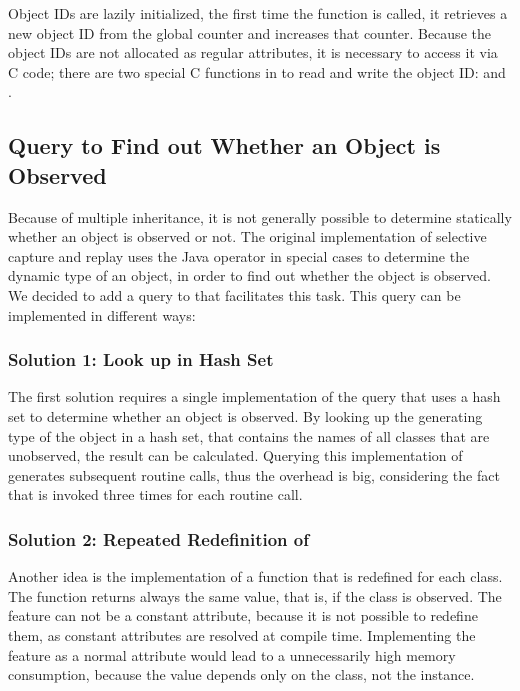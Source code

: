 Object IDs are lazily initialized, the first time the function  is called, it retrieves a new object ID from the global counter  and increases that counter. Because the object IDs are not allocated as regular attributes, it is necessary to access it via C code; there are two special C functions in  to read and write the object ID:  and .


\subsection{Query to Find out Whether an Object is Observed}
\label{lbl:is_observed}
Because of multiple inheritance, it is not generally possible to determine statically whether an object is observed or not. The original implementation of selective capture and replay uses the Java operator  in special cases to determine the dynamic type of an object, in order to find out whether the object is observed. We decided to add a query to  that facilitates this task. This query can be implemented in different ways: 

\subsubsection{Solution 1: Look up in Hash Set}
The first solution requires a single implementation of the query  that uses a hash set to determine whether an object is observed. By looking up the generating type of the object in a hash set, that contains the names of all classes that are unobserved, the result can be calculated. Querying this implementation of  generates subsequent routine calls, thus the overhead is big, considering the fact that  is invoked three times for each routine call.

\subsubsection{Solution 2: Repeated Redefinition of }
Another idea is the implementation of a function that is redefined for each class. The function returns always the same value, that is, if the class is observed. The feature can not be a constant attribute, because it is not possible to redefine them, as constant attributes  are resolved at compile time. Implementing the feature as a normal attribute would lead to a unnecessarily high memory consumption, because the value depends only on the class, not the instance.

